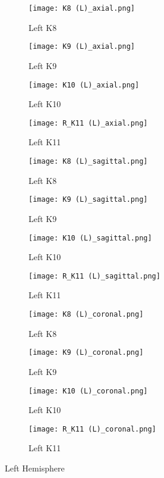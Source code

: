 \documentclass[12pt,fullpage]{article}
\begin{document}
\begin{figure}[h!]
  \centering
  \begin{subfigure}[b]{0.2\linewidth}
    \texttt{[image: K8 (L)\_axial.png]}
    \caption{Left K8}
  \end{subfigure}
  \begin{subfigure}[b]{0.2\linewidth}
    \texttt{[image: K9 (L)\_axial.png]}
    \caption{Left K9}
  \end{subfigure}
  \begin{subfigure}[b]{0.2\linewidth}
    \texttt{[image: K10 (L)\_axial.png]}
    \caption{Left K10}
  \end{subfigure}
    \begin{subfigure}[b]{0.2\linewidth}
    \texttt{[image: R\_K11 (L)\_axial.png]}
    \caption{Left K11}
  \end{subfigure}
    \begin{subfigure}[b]{0.2\linewidth}
    \texttt{[image: K8 (L)\_sagittal.png]}
    \caption{Left K8}
  \end{subfigure}
      \begin{subfigure}[b]{0.2\linewidth}
    \texttt{[image: K9 (L)\_sagittal.png]}
    \caption{Left K9}
  \end{subfigure}
    \begin{subfigure}[b]{0.2\linewidth}
    \texttt{[image: K10 (L)\_sagittal.png]}
    \caption{Left K10}
  \end{subfigure}
    \begin{subfigure}[b]{0.2\linewidth}
    \texttt{[image: R\_K11 (L)\_sagittal.png]}
    \caption{Left K11}
  \end{subfigure}
    \begin{subfigure}[b]{0.2\linewidth}
    \texttt{[image: K8 (L)\_coronal.png]}
    \caption{Left K8}
  \end{subfigure}
      \begin{subfigure}[b]{0.2\linewidth}
    \texttt{[image: K9 (L)\_coronal.png]}
    \caption{Left K9}
  \end{subfigure}
    \begin{subfigure}[b]{0.2\linewidth}
    \texttt{[image: K10 (L)\_coronal.png]}
    \caption{Left K10}
  \end{subfigure}
    \begin{subfigure}[b]{0.2\linewidth}
    \texttt{[image: R\_K11 (L)\_coronal.png]}
    \caption{Left K11}
  \end{subfigure}
  \caption{Left Hemisphere}
  \label{fig:left}
\end{figure}


\end{document}
